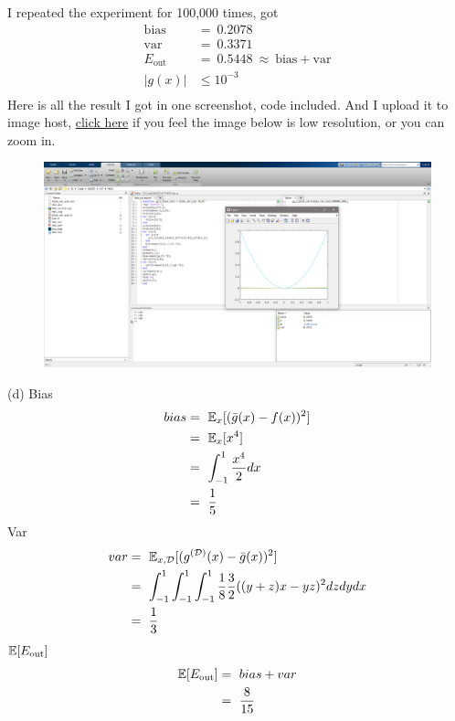 \documentclass{article}
\begin{document}
\begin{tlist}{5}
\begin{tlist}{4}
		I repeated the experiment for 100,000 times, got
		$$\begin{aligned}
				\text{bias}  & =\ 0.2078                                  \\
				\text{var}   & =\ 0.3371                                  \\
				E_\text{out} & =\ 0.5448\ \approx\ \text{bias}+\text{var} \\
				|g(x)|       & \leq 10^{-3}                               \\
			\end{aligned}$$
		Here is all the result I got in one screenshot, code included. And I upload it to image host, \href{https://i.loli.net/2018/09/30/5bb0ddf829ec4.png}{click here} if you feel the image below is low resolution, or you can zoom in.
		\begin{figure}[H]\centering\includegraphics[width=\textwidth]{exp.png}\end{figure}
		\item[(d)]
		Bias
		$$\begin{aligned}
				bias
				 & =\ \mathbb{E}_x[(\bar{g}(x)-f(x))^2]  \\
				 & =\ \mathbb{E}_x[x^4]                  \\
				 & =\ \int_{-1}^1\frac{x^4}{2}dx \\
				 & =\ \frac{1}{5}
			\end{aligned}$$
		Var
		$$\begin{aligned}
				var
				 & =\ \E_{x,\D}[(g^{(\D)}(x)-\bar{g}(x))^2]                                      \\
				 & =\ \int_{-1}^1\int_{-1}^1\int_{-1}^1\frac{1}{8}\frac{3}{2}((y+z)x-yz)^2dzdydx \\
				 & =\ \frac{1}{3}                                                                \\
			\end{aligned}$$
		$\mathbb{E}[E_\text{out}]$
		$$\begin{aligned}
				\mathbb{E}[E_\text{out}]
				 & =\ bias+var     \\
				 & =\ \frac{8}{15}
			\end{aligned}$$
	\end{tlist}
\end{tlist}
\end{document}
